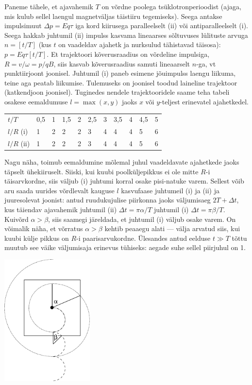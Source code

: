 \documentclass[10pt, twoside]{article}
\begin{document}
{%

\solu
Paneme tähele, et ajavahemik $T$ on võrdne poolega tsüklotronperioodist (ajaga, mis kulub sellel laengul magnetväljas täistiiru tegemiseks).
Seega antakse impulsimuut $\Delta p=Eq\tau$ iga kord kiirusega paralleelselt (ii) 
või antiparalleelselt (i). Seega hakkab juhtumil (ii) impulss kasvama lineaarses sõltuvuses lülituste arvuga $n=[t/T]$ (kus $t$ on vaadeldav
ajahetk ja nurksulud tähistavad täisosa): $p=Eq\tau[t/T]$. Et trajektoori kõverusraadius on võrdeline impulsiga, $R=v/\omega=p/qB$, siis 
kasvab kõverusraadius samuti lineaarselt $n$-ga, vt punktiirjoont joonisel. 
Juhtumil (i) paneb esimene jõuimpulss laengu liikuma, teine aga peatab liikumise. Tulemuseks on joonisel toodud laineline trajektoor (katkendjoon joonisel).
Tuginedes nendele trajektooridele saame teha tabeli osakese eemaldumuse $l = \max (x,y)$ jaoks $x$ või $y$-teljest erinevatel ajahetkedel.

\begin{tabular}{lllllllllll}
	$t/T$ & 0,5 & 1 & 1,5 & 2 & 2,5 & 3 & 3,5 & 4 & 4,5 & 5 \\
	$l/R$ (i) & 1 & 2 & 2 & 2 & 3 & 4 & 4 & 4 & 5 & 6 \\
	$l/R$ (ii) & 1 & 2 & 2 & 2 & 3 & 4 & 4 & 4 & 5 & 6
\end{tabular}

Nagu näha, toimub eemaldumine mõlemal juhul vaadeldavate ajahetkede jaoks täpselt ühekiiruselt. Siiski, kui kuubi poolküljepikkus ei ole 
mitte $R$-i täisarvkordne, siis väljub (i) juhtumi korral osake pisi-natuke varem. Sellest võib aru saada uurides võrdlevalt 
kauguse $l$ kasvufaase juhtumeil (i) ja (ii) ja juuresolevat joonist: antud ruudukujulise piirkonna jaoks väljumisaeg $2T+\Delta t$, kus
täiendav ajavahemik juhtumil (ii) $\Delta t=\pi \alpha/T$ juhtumil (i) $\Delta t=\pi \beta/T$.
Kuivõrd $\alpha > \beta$, siis saamegi järeldada, et juhtumil (i) väljub osake varem. On võimalik näha, et võrratus 
$\alpha > \beta$ kehtib peaaegu alati --- välja arvatud siis, kui kuubi külje pikkus on $R$-i paarisarvukordne.
Ülesandes antud eelduse $t\gg T$ tõttu muutub see väike väljumisaja erinevus tühiseks: aegade suhe sellel piirjuhul on 1.
\begin{center}
	\includegraphics[width=0.35\textwidth]{2010-lahg-08-lah}
\end{center}
\probend
\bigskip

}
\end{document}
